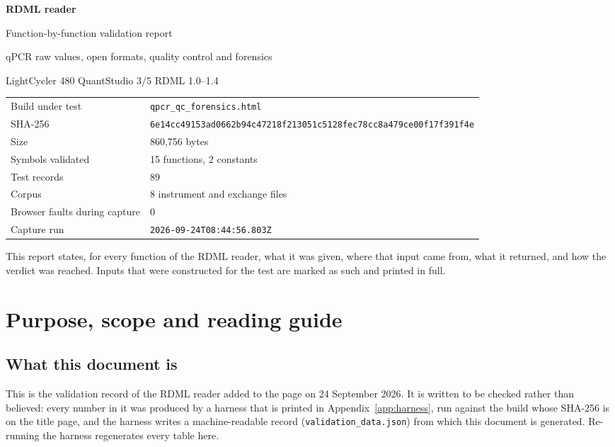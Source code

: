 \documentclass[10pt,a4paper,twoside]{report}
\begin{document}
\begin{titlepage}\centering\sffamily
\vspace*{18mm}
{\Huge\bfseries RDML reader\par}
\vspace{4mm}
{\LARGE Function-by-function validation report\par}
\vspace{10mm}
{\large qPCR raw values, open formats, quality control and forensics\par}
\vspace{2mm}
{\large LightCycler 480 \textperiodcentered{} QuantStudio 3/5 \textperiodcentered{} RDML 1.0--1.4\par}
\vspace{16mm}
\begin{minipage}{0.86\textwidth}\centering\small
\begin{tabular}{@{}ll@{}}
\toprule
Build under test & \texttt{qpcr\_qc\_forensics.html} \\
SHA-256 & \texttt{6e14cc49153ad0662b94c47218f213051c5128fec78cc8a479ce00f17f391f4e} \\
Size & 860,756 bytes \\
Symbols validated & 15 functions, 2 constants \\
Test records & 89 \\
Corpus & 8 instrument and exchange files \\
Browser faults during capture & 0 \\
Capture run & \texttt{2026-09-24T08:44:56.803Z} \\
\bottomrule
\end{tabular}
\end{minipage}
\vfill
{\small This report states, for every function of the RDML reader, what it was given, where that
input came from, what it returned, and how the verdict was reached. Inputs that were constructed
for the test are marked as such and printed in full.\par}
\vspace{8mm}
\end{titlepage}
\tableofcontents
\clearpage

\chapter{Purpose, scope and reading guide}

\section{What this document is}
This is the validation record of the RDML reader added to the page on 24 September 2026. It is
written to be checked rather than believed: every number in it was produced by a harness that is
printed in Appendix~\ref{app:harness}, run against the build whose SHA-256 is on the title page,
and the harness writes a machine-readable record (\texttt{validation\_data.json}) from which this
document is generated. Re-running the harness regenerates every table here.
\end{document}

